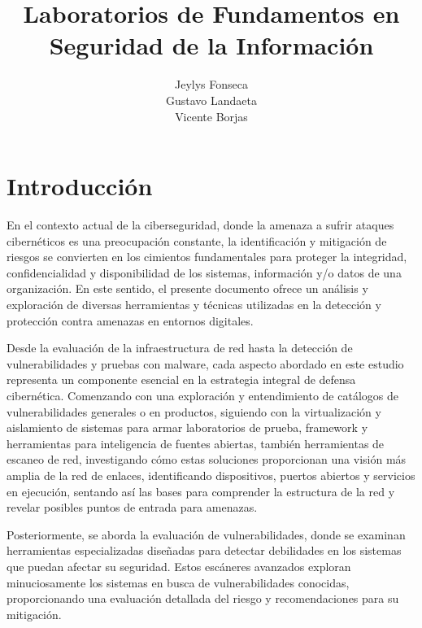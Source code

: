 \documentclass[stu, 11pt, letterpaper, donotrepeattitle, floatsintext, natbib]{apa7}
\title{\Large Laboratorios de Fundamentos en Seguridad de la Información}
\author{Jeylys Fonseca \\Gustavo Landaeta \\Vicente Borjas} %
\begin{document}
\maketitle


\renewcommand\contentsname{\largeÍndice}
\setcounter{tocdepth}{2}
\newpage
\renewcommand{\listfigurename}{\largeÍndice de fíguras}
\newpage
\renewcommand{\listtablename}{\largeÍndice de tablas}
\newpage


\section{\large Introducción}

En el contexto actual de la ciberseguridad, donde la amenaza a sufrir ataques cibernéticos es una preocupación constante, la identificación y mitigación de riesgos se convierten en los cimientos fundamentales para proteger la integridad, confidencialidad y disponibilidad de los sistemas, información y/o datos de una organización. En este sentido, el presente documento ofrece un análisis y exploración de diversas herramientas y técnicas utilizadas en la detección y protección contra amenazas en entornos digitales.  

Desde la evaluación de la infraestructura de red hasta la detección de vulnerabilidades y pruebas con malware, cada aspecto abordado en este estudio representa un componente esencial en la estrategia integral de defensa cibernética. Comenzando con una exploración y entendimiento de catálogos de vulnerabilidades generales o en productos, siguiendo con la virtualización y aislamiento de sistemas para armar laboratorios de prueba, framework y herramientas para inteligencia de fuentes abiertas, también herramientas de escaneo de red, investigando cómo estas soluciones proporcionan una visión más amplia de la red de enlaces, identificando dispositivos, puertos abiertos y servicios en ejecución, sentando así las bases para comprender la estructura de la red y revelar posibles puntos de entrada para amenazas.  

Posteriormente, se aborda la evaluación de vulnerabilidades, donde se examinan herramientas especializadas diseñadas para detectar debilidades en los sistemas que puedan afectar su seguridad. Estos escáneres avanzados exploran minuciosamente los sistemas en busca de vulnerabilidades conocidas, proporcionando una evaluación detallada del riesgo y recomendaciones para su mitigación.  
\end{document}
